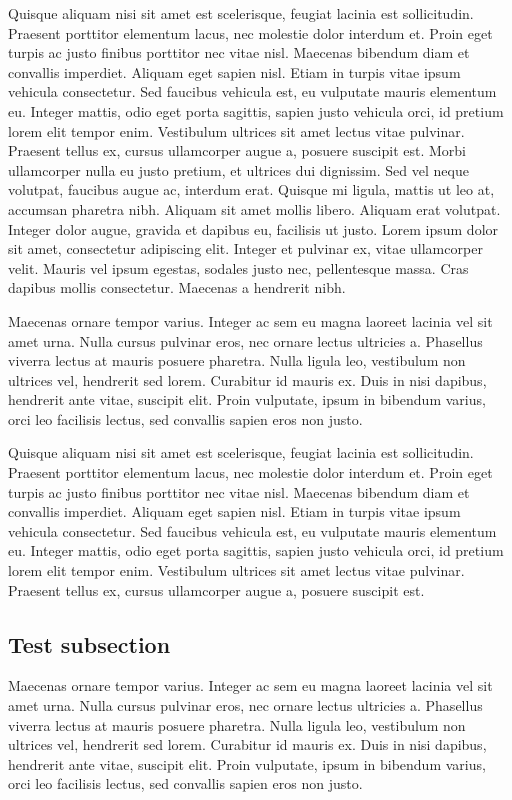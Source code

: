 Quisque aliquam nisi sit amet est scelerisque, feugiat lacinia est sollicitudin. Praesent porttitor elementum lacus, nec molestie dolor interdum et. Proin eget turpis ac justo finibus porttitor nec vitae nisl. Maecenas bibendum diam et convallis imperdiet. Aliquam eget sapien nisl. Etiam in turpis vitae ipsum vehicula consectetur. Sed faucibus vehicula est, eu vulputate mauris elementum eu. Integer mattis, odio eget porta sagittis, sapien justo vehicula orci, id pretium lorem elit tempor enim. Vestibulum ultrices sit amet lectus vitae pulvinar. Praesent tellus ex, cursus ullamcorper augue a, posuere suscipit est.
Morbi ullamcorper nulla eu justo pretium, et ultrices dui dignissim. Sed vel neque volutpat, faucibus augue ac, interdum erat. Quisque mi ligula, mattis ut leo at, accumsan pharetra nibh. Aliquam sit amet mollis libero. Aliquam erat volutpat. Integer dolor augue, gravida et dapibus eu, facilisis ut justo. Lorem ipsum dolor sit amet, consectetur adipiscing elit. Integer et pulvinar ex, vitae ullamcorper velit. Mauris vel ipsum egestas, sodales justo nec, pellentesque massa. Cras dapibus mollis consectetur. Maecenas a hendrerit nibh.

Maecenas ornare tempor varius. Integer ac sem eu magna laoreet lacinia vel sit amet urna. Nulla cursus pulvinar eros, nec ornare lectus ultricies a. Phasellus viverra lectus at mauris posuere pharetra. Nulla ligula leo, vestibulum non ultrices vel, hendrerit sed lorem. Curabitur id mauris ex. Duis in nisi dapibus, hendrerit ante vitae, suscipit elit. Proin vulputate, ipsum in bibendum varius, orci leo facilisis lectus, sed convallis sapien eros non justo.

Quisque aliquam nisi sit amet est scelerisque, feugiat lacinia est sollicitudin. Praesent porttitor elementum lacus, nec molestie dolor interdum et. Proin eget turpis ac justo finibus porttitor nec vitae nisl. Maecenas bibendum diam et convallis imperdiet. Aliquam eget sapien nisl. Etiam in turpis vitae ipsum vehicula consectetur. Sed faucibus vehicula est, eu vulputate mauris elementum eu. Integer mattis, odio eget porta sagittis, sapien justo vehicula orci, id pretium lorem elit tempor enim. Vestibulum ultrices sit amet lectus vitae pulvinar. Praesent tellus ex, cursus ullamcorper augue a, posuere suscipit est.


\subsection{Test subsection}
Maecenas ornare tempor varius. Integer ac sem eu magna laoreet lacinia vel sit amet urna. Nulla cursus pulvinar eros, nec ornare lectus ultricies a. Phasellus viverra lectus at mauris posuere pharetra. Nulla ligula leo, vestibulum non ultrices vel, hendrerit sed lorem. Curabitur id mauris ex. Duis in nisi dapibus, hendrerit ante vitae, suscipit elit. Proin vulputate, ipsum in bibendum varius, orci leo facilisis lectus, sed convallis sapien eros non justo.

